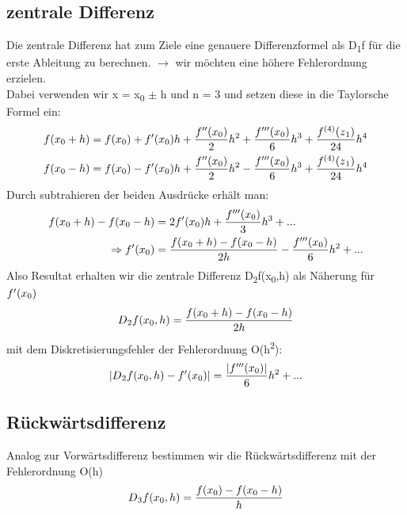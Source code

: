 \documentclass{article}
\theoremstyle{satz}
\theoremstyle{definition}
\begin{document}
\subsection{zentrale Differenz}
Die zentrale Differenz hat zum Ziele eine genauere Differenzformel als D\textsubscript{1}f für die erste Ableitung zu berechnen. $\rightarrow$ wir möchten eine höhere Fehlerordnung erzielen. \\
Dabei verwenden wir x = x\textsubscript{0} $\pm$ h und n = 3 und setzen diese in die Taylorsche Formel ein:
\begin{equation}
\begin{split}
f(x\textsubscript{0} + h) & = f(x\textsubscript{0}) + f'(x\textsubscript{0})h + \frac{f''(x\textsubscript{0})}{2}h^2+\frac{f'''(x\textsubscript{0})}{6}h^3+\frac{f\textsuperscript{(4)}(z\textsubscript{1})}{24}h^4 \\
f(x\textsubscript{0} - h) & = f(x\textsubscript{0}) - f'(x\textsubscript{0})h + \frac{f''(x\textsubscript{0})}{2}h^2-\frac{f'''(x\textsubscript{0})}{6}h^3+\frac{f\textsuperscript{(4)}(z\textsubscript{1})}{24}h^4
\end{split}
\end{equation}
Durch subtrahieren der beiden Ausdrücke erhält man:
\begin{equation}
\begin{split}
f(x\textsubscript{0}+h)-f(x\textsubscript{0}-h) & = 2f'(x\textsubscript{0})h+\frac{f'''(x\textsubscript{0})}{3}h^3+... \\
\Rightarrow f'(x\textsubscript{0}) & = \frac{f(x\textsubscript{0}+h)-f(x\textsubscript{0}-h)}{2h}-\frac{f'''(x\textsubscript{0})}{6}h^2+...
\end{split}
\end{equation}
Also Resultat erhalten wir die zentrale Differenz D\textsubscript{2}f(x\textsubscript{0},h) als Näherung für $f'(x\textsubscript{0})$
\begin{equation}
D\textsubscript{2}f(x\textsubscript{0},h) = \frac{f(x\textsubscript{0}+h)-f(x\textsubscript{0}-h)}{2h}
\end{equation}
mit dem Diskretisierungsfehler der Fehlerordnung O(h\textsuperscript{2}):
\begin{equation}
|D\textsubscript{2}f(x\textsubscript{0},h)-f'(x\textsubscript{0})| = \frac{|f'''(x\textsubscript{0})|}{6}h^2+...
\end{equation}

\subsection{Rückwärtsdifferenz}
Analog zur Vorwärtsdifferenz bestimmen wir die Rückwärtsdifferenz mit der Fehlerordnung O(h)
\begin{equation}
D\textsubscript{3}f(x\textsubscript{0},h) = \frac{f(x\textsubscript{0}) - f(x\textsubscript{0}-h)}{h}
\end{equation}
\end{document}
